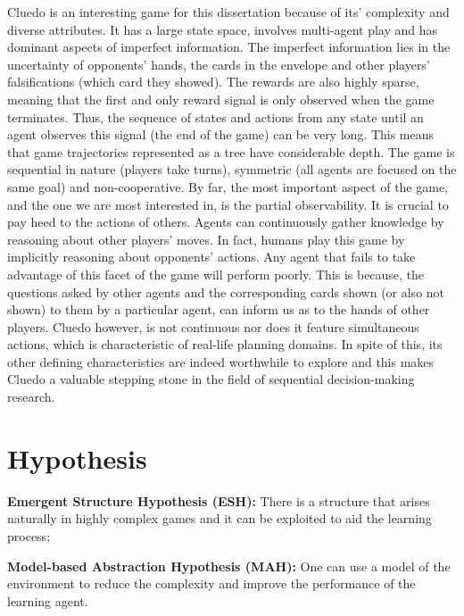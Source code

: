 \documentclass[msc, deptreport, ai, romanprepages]{infthesis}
\begin{document}
Cluedo is an interesting game for this dissertation because of its’ complexity and diverse attributes. It has a large state space, involves multi-agent play and has dominant aspects of imperfect information. The imperfect information lies in the uncertainty of opponents’ hands, the cards in the envelope and other players’ falsifications (which card they showed). The rewards are also highly sparse, meaning that the first and only reward signal is only observed when the game terminates. Thus, the sequence of states and actions from any state until an agent observes this signal (the end of the game) can be very long. This means that game trajectories represented as a tree have considerable depth. The game is sequential in nature (players take turns), symmetric (all agents are focused on the same goal) and non-cooperative. By far, the most important aspect of the game, and the one we are most interested in, is the partial observability. It is crucial to pay heed to the actions of others. Agents can continuously gather knowledge by reasoning about other players’ moves. In fact, humans play this game by implicitly reasoning about opponents’ actions. Any agent that fails to take advantage of this facet of the game will perform poorly. This is because, the questions asked by other agents and the corresponding cards shown (or also not shown) to them by a particular agent, can inform us as to the hands of other players. Cluedo however, is not continuous nor does it feature simultaneous actions, which is characteristic of real-life planning domains. In spite of this, its other defining characteristics are indeed worthwhile to explore and this makes Cluedo a valuable stepping stone in the field of sequential decision-making research.

\section{Hypothesis}
\begin{description}
\item \textbf{Emergent Structure Hypothesis (ESH):} There is a structure that arises naturally in highly complex games and it can be exploited to aid the learning process; 
\item \textbf{Model-based Abstraction Hypothesis (MAH):} One can use a model of the environment to reduce the complexity and improve the performance of the learning agent.
\end{description}
\end{document}
